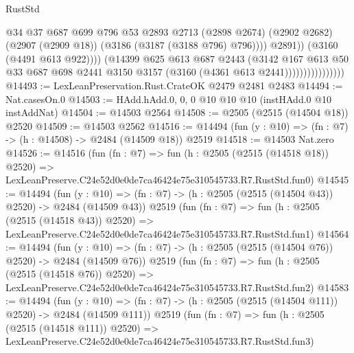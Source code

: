 \begin{lexlean}{RustStd}
\begin{coremodule}
                                        @34
                                        @37
                                        @687
                                        @699
                                        @796
                                        @53
                                        @2893
                                        @2713
                                        (@2898 @2674)
                                        (@2902 @2682)
                                        (@2907 (@2909 @18))
                                        (@3186 (@3187 (@3188 @796) @796))))
                                    @2891))
                                (@3160 (@4491 @613 @922))))
                            (@14399
                              @625
                              @613
                              @687
                              @2443
                              (@3142
                                @167
                                @613
                                @50
                                @33
                                @687
                                @698
                                @2441
                                @3150
                                @3157
                                (@3160 (@4361 @613 @2441))))))))))))))))
@14493 := LexLeanPreservation.Rust.CrateOK @2479 @2481 @2483
@14494 := Nat.casesOn.{0}
@14503 := HAdd.hAdd.{0, 0, 0} @10 @10 @10 (instHAdd.{0} @10 instAddNat)
@14504 := @14503 @2564
@14508 := @2505 (@2515 (@14504 @18)) @2520
@14509 := @14503 @2562
@14516 := @14494 (fun (y : @10) => (fn : @7) -> (h : @14508) -> @2484 (@14509 @18)) @2519
@14518 := @14503 Nat.zero
@14526 := @14516
    (fun (fn : @7) =>
    fun (h : @2505 (@2515 (@14518 @18)) @2520) =>
    LexLeanPreserve.C24e52d0e0de7ca46424e75e310545733.R7.RustStd.fun0)
@14545 := @14494
    (fun (y : @10) => (fn : @7) -> (h : @2505 (@2515 (@14504 @43)) @2520) -> @2484 (@14509 @43))
    @2519
    (fun (fn : @7) =>
    fun (h : @2505 (@2515 (@14518 @43)) @2520) =>
    LexLeanPreserve.C24e52d0e0de7ca46424e75e310545733.R7.RustStd.fun1)
@14564 := @14494
    (fun (y : @10) => (fn : @7) -> (h : @2505 (@2515 (@14504 @76)) @2520) -> @2484 (@14509 @76))
    @2519
    (fun (fn : @7) =>
    fun (h : @2505 (@2515 (@14518 @76)) @2520) =>
    LexLeanPreserve.C24e52d0e0de7ca46424e75e310545733.R7.RustStd.fun2)
@14583 := @14494
    (fun (y : @10) => (fn : @7) -> (h : @2505 (@2515 (@14504 @111)) @2520) -> @2484 (@14509 @111))
    @2519
    (fun (fn : @7) =>
    fun (h : @2505 (@2515 (@14518 @111)) @2520) =>
    LexLeanPreserve.C24e52d0e0de7ca46424e75e310545733.R7.RustStd.fun3)

\end{coremodule}
\end{lexlean}
